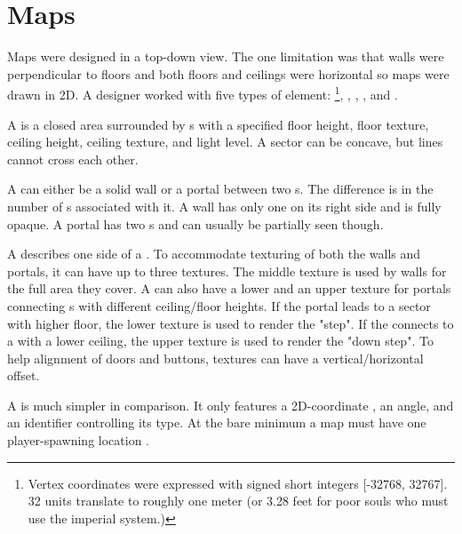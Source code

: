 

\section{Maps}
Maps were designed in a top-down view. The one limitation was that walls were perpendicular to floors and both floors and ceilings were horizontal so maps were drawn in 2D. A designer worked with five types of element: \footnote{Vertex coordinates were expressed with signed short integers [-32768, 32767]. 32 units translate to roughly one meter (or 3.28 feet for poor souls who must use the imperial system.)}, , , , and .\\
\par
{}

\par
A  is a closed area surrounded by s with a specified floor height, floor texture, ceiling height, ceiling texture, and light level. A sector can be concave, but lines cannot cross each other.\\
\par
A  can either be a solid wall or a portal between two s. The difference is in the number of s associated with it. A wall has only one  on its right side and is fully opaque. A portal has two s and can usually be partially seen though.\\
\par
A  describes one side of a . To accommodate texturing of both the walls and portals, it can have up to three textures. The middle texture is used by walls for the full area they cover. A  can also have a lower and an upper texture for portals connecting s with different ceiling/floor heights. If the portal leads to a sector with higher floor, the lower texture is used to render the "step". If the  connects to a  with a lower ceiling, the upper texture is used to render the "down step". To help alignment of doors and buttons,  textures can have a vertical/horizontal offset. \\
\par
A  is much simpler in comparison. It only features a 2D-coordinate , an angle, and an identifier controlling its type. At the bare minimum a map must have one player-spawning location .\\

